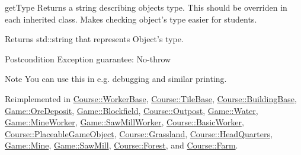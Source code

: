 get\-Type Returns a string describing objects type. This should be overriden in each inherited class. Makes checking object's type easier for students. 

\begin{DoxyReturn}{Returns}
std\-::string that represents Object's type. 
\end{DoxyReturn}
\begin{DoxyPostcond}{Postcondition}
Exception guarantee\-: No-\/throw 
\end{DoxyPostcond}
\begin{DoxyNote}{Note}
You can use this in e.\-g. debugging and similar printing. 
\end{DoxyNote}


Reimplemented in \hyperlink{classCourse_1_1WorkerBase_afe6049810eec47fffe2c2a7334564ef9}{Course\-::\-Worker\-Base}, \hyperlink{classCourse_1_1TileBase_af1a8aaa3407ad3ade7ffe8f2fb421288}{Course\-::\-Tile\-Base}, \hyperlink{classCourse_1_1BuildingBase_ac2cc44e08dc73d05b1617bf71295baaf}{Course\-::\-Building\-Base}, \hyperlink{classGame_1_1OreDeposit_acc2ba331cb40a464821fe6ebaaf63573}{Game\-::\-Ore\-Deposit}, \hyperlink{classGame_1_1Blockfield_af5e2a4c262cb1f59e442b60c8404b715}{Game\-::\-Blockfield}, \hyperlink{classCourse_1_1Outpost_a8c89c67187451e0a49ecd57d4fc80602}{Course\-::\-Outpost}, \hyperlink{classGame_1_1Water_ab45fa1bb08eb0893d7bec1a97e7b22f0}{Game\-::\-Water}, \hyperlink{classGame_1_1MineWorker_a984c2ede11ac50460620a4d982249dbe}{Game\-::\-Mine\-Worker}, \hyperlink{classGame_1_1SawMillWorker_af64ec6de521d31ec3fdc885a3bc69cba}{Game\-::\-Saw\-Mill\-Worker}, \hyperlink{classCourse_1_1BasicWorker_a8396e00dafd128cbb86e479296d75c12}{Course\-::\-Basic\-Worker}, \hyperlink{classCourse_1_1PlaceableGameObject_adcd0c91b52ccedd434092380644f210e}{Course\-::\-Placeable\-Game\-Object}, \hyperlink{classCourse_1_1Grassland_a0a652bbecdda0216613dad980936e30e}{Course\-::\-Grassland}, \hyperlink{classCourse_1_1HeadQuarters_a1d9a996a6a87ca31aeb63dff2d41d242}{Course\-::\-Head\-Quarters}, \hyperlink{classGame_1_1Mine_aaf18e426d1978c8e6f0cf0dc7435c257}{Game\-::\-Mine}, \hyperlink{classGame_1_1SawMill_a1dd6fd6bce2044107b121f3bbf012691}{Game\-::\-Saw\-Mill}, \hyperlink{classCourse_1_1Forest_a783378b8f5c1ec5d0c5c4a771291a902}{Course\-::\-Forest}, and \hyperlink{classCourse_1_1Farm_a54ade72809a36d31e0e426eb79d6251a}{Course\-::\-Farm}.

